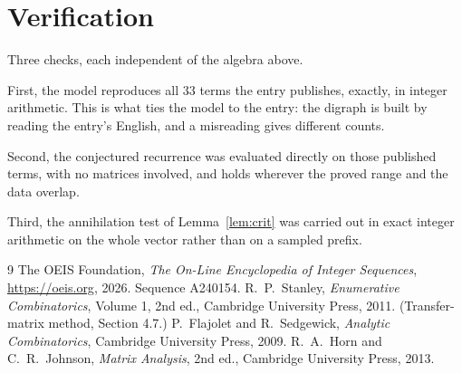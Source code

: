 \documentclass[11pt,a4paper]{article}
\theoremstyle{plain}
\theoremstyle{definition}
\begin{document}
\section{Verification}

Three checks, each independent of the algebra above.

First, the model reproduces all $33$ terms the entry publishes, exactly, in integer
arithmetic. This is what ties the model to the entry: the digraph is built by reading the
entry's English, and a misreading gives different counts.

Second, the conjectured recurrence was evaluated directly on those published terms, with no
matrices involved, and holds wherever the proved range and the data overlap.

Third, the annihilation test of Lemma~\ref{lem:crit} was carried out in exact integer
arithmetic on the whole vector rather than on a sampled prefix.

\begin{thebibliography}{9}
 The OEIS Foundation, \emph{The On-Line Encyclopedia of Integer
Sequences}, \url{https://oeis.org}, 2026. Sequence A240154.
 R.~P.~Stanley, \emph{Enumerative Combinatorics}, Volume 1, 2nd ed.,
Cambridge University Press, 2011. (Transfer-matrix method, Section 4.7.)
 P.~Flajolet and R.~Sedgewick, \emph{Analytic Combinatorics}, Cambridge
University Press, 2009.
 R.~A.~Horn and C.~R.~Johnson, \emph{Matrix Analysis}, 2nd ed., Cambridge
University Press, 2013.
\end{thebibliography}
\end{document}
